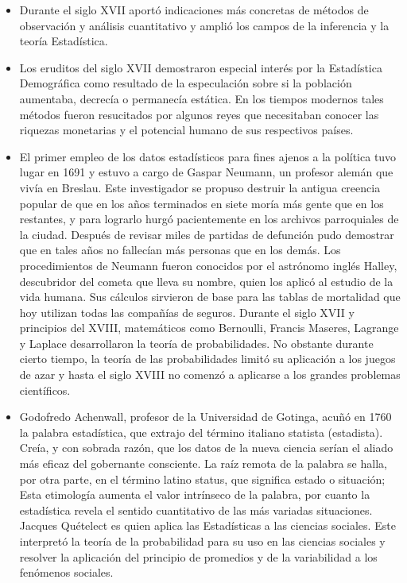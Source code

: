 \begin{itemize}
    \item Durante el siglo XVII aport\'o indicaciones m\'as concretas de m\'etodos de observaci\'on y an\'alisis cuantitativo y ampli\'o los campos de la inferencia y la teor\'ia Estad\'istica.
    \item Los eruditos del siglo XVII demostraron especial inter\'es por la Estad\'istica Demogr\'afica como resultado de la especulaci\'on sobre si la poblaci\'on aumentaba, decrec\'ia o permanec\'ia est\'atica. En los tiempos modernos tales m\'etodos fueron resucitados por algunos reyes que necesitaban conocer las riquezas monetarias y el potencial humano de sus respectivos pa\'ises. 
    \item El primer empleo de los datos estad\'isticos para fines ajenos a la pol\'itica tuvo lugar en 1691 y estuvo a cargo de Gaspar Neumann, un profesor alem\'an que viv\'ia en Breslau. Este investigador se propuso destruir la antigua creencia popular de que en los a\~nos terminados en siete mor\'ia m\'as gente que en los restantes, y para lograrlo hurg\'o pacientemente en los archivos parroquiales de la ciudad. Despu\'es de revisar miles de partidas de defunci\'on pudo demostrar que en tales a\~nos no fallec\'ian m\'as personas que en los dem\'as. Los procedimientos de Neumann fueron conocidos por el astr\'onomo ingl\'es Halley, descubridor del cometa que lleva su nombre, quien los aplic\'o al estudio de la vida humana. Sus c\'alculos sirvieron de base para las tablas de mortalidad que hoy utilizan todas las compa\~n\'ias de seguros. Durante el siglo XVII y principios del XVIII, matem\'aticos como Bernoulli, Francis Maseres, Lagrange y Laplace desarrollaron la teor\'ia de probabilidades. No obstante durante cierto tiempo, la teor\'ia de las probabilidades limit\'o su aplicaci\'on a los juegos de azar y hasta el siglo XVIII no comenz\'o a aplicarse a los grandes problemas cient\'ificos.
    \item Godofredo Achenwall, profesor de la Universidad de Gotinga, acu\~n\'o en 1760 la palabra estad\'istica, que extrajo del t\'ermino italiano statista (estadista). Cre\'ia, y con sobrada raz\'on, que los datos de la nueva ciencia ser\'ian el aliado m\'as eficaz del gobernante consciente. La ra\'iz remota de la palabra se halla, por otra parte, en el t\'ermino latino status, que significa estado o situaci\'on; Esta etimolog\'ia aumenta el valor intr\'inseco de la palabra, por cuanto la estad\'istica revela el sentido cuantitativo de las m\'as variadas situaciones. Jacques Qu\'etelect es quien aplica las Estad\'isticas a las ciencias sociales. Este interpret\'o la teor\'ia de la probabilidad para su uso en las ciencias sociales y resolver la aplicaci\'on del principio de promedios y de la variabilidad a los fen\'omenos sociales.

\end{itemize}
